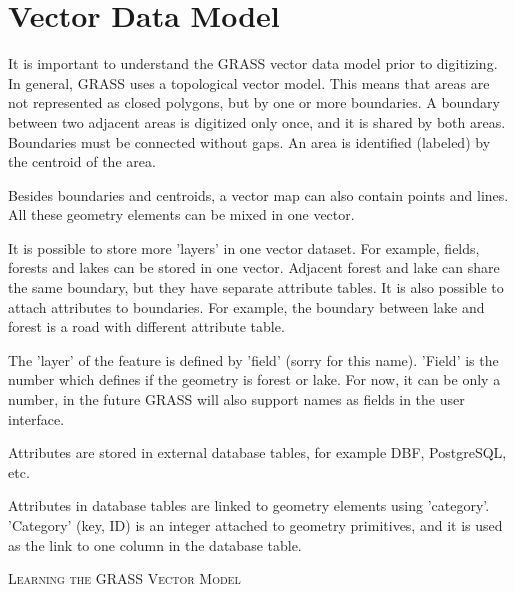 \section{Vector Data Model}
It is important to understand the GRASS vector data model prior to
digitizing.
In general, GRASS uses a topological vector model. This
means that areas are not represented as closed polygons, but by one or more
boundaries. A boundary between two adjacent areas is digitized only once, and it
is shared by both areas. Boundaries must be connected without gaps. An area is
identified (labeled) by the centroid of the area.

Besides boundaries and centroids, a vector map can also contain
points and lines. All these geometry elements can be mixed
in one vector.

It is possible to store more 'layers' in one vector dataset. For example,
fields, forests and lakes can be stored in one vector. Adjacent
forest and lake can share the same boundary, but they have separate attribute tables.
It is also possible to attach attributes to boundaries. For example, the boundary between lake and forest is a road with different attribute table.

The 'layer' of the feature is defined by 'field' (sorry for this name).
'Field' is the number which defines if the geometry is forest or lake.
For now, it can be only a number, in the future GRASS will also support  
names as fields in the user interface.

Attributes are stored in external database tables, for example
DBF, PostgreSQL, etc.

Attributes in database tables are linked to geometry elements
using 'category'. 'Category' (key, ID) is an
integer attached to geometry primitives, and it is used as the link to one
column in the database table.
\begin{Tip}\caption{\textsc{Learning the GRASS Vector Model}}
\end{Tip} 
